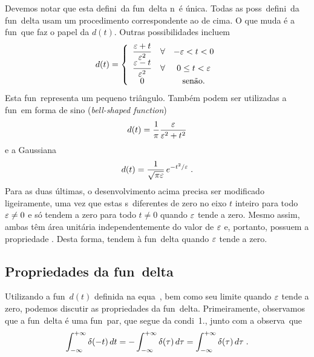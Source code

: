 Devemos notar que esta defini\cao\ da fun\cao\ delta n\ao\ \'e \'unica.
Todas as poss\iveis\ defini\coes\ da fun\cao\ delta usam um procedimento
correspondente ao de cima. O que muda \'e a fun\cao\ que faz o papel da
$d(t)$. Outras possibilidades incluem
\begin{equation}
d(t) = \left\{ \begin{array}{ccc}
\displaystyle \frac{\varepsilon+t}{\varepsilon^2} & \forall & -\varepsilon < t < 0 \\
\displaystyle \frac{\varepsilon-t}{\varepsilon^2} & \forall & 0 \leq t < \varepsilon \\
0 && \mbox{sen\~ao}.
\end{array} \right.
\label{eq:dta}
\end{equation}
Esta fun\cao\ representa um pequeno tri\^angulo. Tamb\'em podem ser
utilizadas a fun\cao\ em forma de sino ({\it bell-shaped function})
\begin{equation}
d(t) = \frac{1}{\pi} \frac{\varepsilon}{\varepsilon^2+t^2}
\label{eq:dtb}
\end{equation}
e a Gaussiana
\begin{equation}
d(t) = \frac{1}{\sqrt{\pi\varepsilon}} \, e^{-t^2/\varepsilon} \; .
\label{eq:dtc}
\end{equation}
Para as duas \'ultimas, o desenvolvimento acima precisa ser modificado
ligeiramente, uma vez que estas s\ao\ diferentes de zero no eixo $t$
inteiro para todo $\varepsilon\neq0$ e s\'o tendem a zero para todo $t\neq0$
quando $\varepsilon$ tende a zero. Mesmo assim, ambas t\^em \'area unit\'aria
independentemente do valor de $\varepsilon$ e, portanto, possuem a propriedade
. Desta forma, tendem \`a fun\cao\ delta quando $\varepsilon$
tende a zero.

\subsection{Propriedades da fun\cao\ delta}

Utilizando a fun\cao\ $d(t)$ definida na equa\cao\ , bem
como seu limite quando $\varepsilon$ tende a zero, podemos discutir as
propriedades da fun\cao\ delta. Primeiramente, observamos que a fun\cao\
delta \'e uma fun\cao\ par, que segue da condi\cao\ 1., junto com a
observa\cao\ que
\begin{equation}
\int_{-\infty}^{+\infty} \delta(-t) \, dt =  
- \int_{-\infty}^{+\infty} \delta(\tau) \, d\tau =  
\int_{-\infty}^{+\infty} \delta(\tau) \, d\tau \; .
\label{eq:delpar}
\end{equation}

